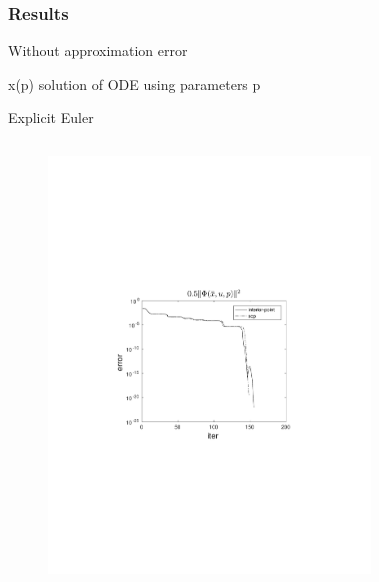 \documentclass{beamer}
\begin{document}
\begin{frame}
    \frametitle{Results}
        Without approximation error

        x(p) solution of ODE using parameters p

        Explicit Euler

    \begin{columns}[t]
            \begin{figure}
                \centering
                \includegraphics[trim=4cm 9cm 4cm 8.5cm, clip=true, width=\linewidth]{img/convPlotPhi_ref2}
            \end{figure}
            \begin{figure}
                \centering

\end{figure}
\end{columns}
\end{frame}
\end{document}
